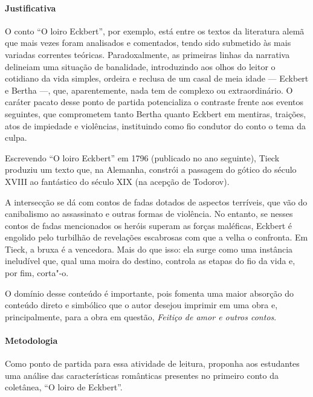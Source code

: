 \documentclass[12pt]{extarticle}
\begin{document}
\paragraph{Justificativa} O conto ``O loiro Eckbert'', por exemplo, está entre os textos da
literatura alemã que mais vezes foram analisados e comentados, tendo
sido submetido às mais variadas correntes teóricas. Paradoxalmente, as
primeiras linhas da narrativa delineiam uma situação de banalidade,
introduzindo aos olhos do leitor o cotidiano da vida simples, ordeira e
reclusa de um casal de meia idade --- Eckbert e Bertha ---, que,
aparentemente, nada tem de complexo ou extraordinário. O caráter pacato
desse ponto de partida potencializa o contraste frente aos eventos
seguintes, que comprometem tanto Bertha quanto Eckbert em mentiras,
traições, atos de impiedade e violências, instituindo como fio condutor
do conto o tema da culpa.

Escrevendo ``O loiro Eckbert'' em 1796 (publicado no ano seguinte),
Tieck produziu um texto que, na Alemanha, constrói a passagem do gótico
do século XVIII ao fantástico do século XIX (na acepção de Todorov).

A intersecção se dá com contos de fadas dotados de aspectos terríveis,
que vão do canibalismo ao assassinato e outras formas de violência. No
entanto, se nesses contos de fadas mencionados os heróis superam as
forças maléficas, Eckbert é engolido pelo turbilhão de revelações
escabrosas com que a velha o confronta. Em Tieck, a bruxa é a vencedora.
Mais do que isso: ela surge como uma instância ineludível que, qual uma
moira do destino, controla as etapas do fio da vida e, por fim, corta"-o.

O domínio desse conteúdo é importante, pois fomenta uma maior absorção do conteúdo 
direto e simbólico que o autor desejou imprimir em uma obra e, principalmente, 
para a obra em questão, \textit{Feitiço de amor e outros contos}.

\paragraph{Metodologia}
Como ponto de partida para essa atividade de leitura, proponha aos estudantes 
uma análise das características românticas presentes no primeiro conto da 
coletânea, ``O loiro de Eckbert''.
\end{document}
